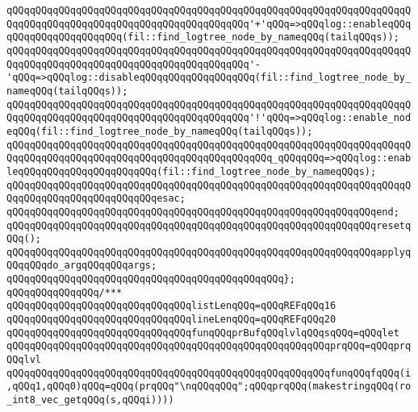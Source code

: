 \verb|qQQqqQQqqQQqqQQqqQQqqQQqqQQqqQQqqQQqqQQqqQQqqQQqqQQqqQQqqQQqqQQqqQQqqQQqqQQqqQQqqQQqqQQqqQQqqQQqqQQqqQQqqQQqqQQq'+'qQQq=>qQQqlog::enableqQQqqQQqqQQqqQQqqQQqqQQq(fil::find_logtree_node_by_nameqQQq(tailqQQqs));|\newline
\verb|qQQqqQQqqQQqqQQqqQQqqQQqqQQqqQQqqQQqqQQqqQQqqQQqqQQqqQQqqQQqqQQqqQQqqQQqqQQqqQQqqQQqqQQqqQQqqQQqqQQqqQQqqQQqqQQq'-'qQQq=>qQQqlog::disableqQQqqQQqqQQqqQQqqQQq(fil::find_logtree_node_by_nameqQQq(tailqQQqs));|\newline
\verb|qQQqqQQqqQQqqQQqqQQqqQQqqQQqqQQqqQQqqQQqqQQqqQQqqQQqqQQqqQQqqQQqqQQqqQQqqQQqqQQqqQQqqQQqqQQqqQQqqQQqqQQqqQQqqQQq'!'qQQq=>qQQqlog::enable_nodeqQQq(fil::find_logtree_node_by_nameqQQq(tailqQQqs));|\newline
\verb|qQQqqQQqqQQqqQQqqQQqqQQqqQQqqQQqqQQqqQQqqQQqqQQqqQQqqQQqqQQqqQQqqQQqqQQqqQQqqQQqqQQqqQQqqQQqqQQqqQQqqQQqqQQqqQQqqQQq_qQQqqQQq=>qQQqlog::enableqQQqqQQqqQQqqQQqqQQqqQQq(fil::find_logtree_node_by_nameqQQqs);|\newline
\verb|qQQqqQQqqQQqqQQqqQQqqQQqqQQqqQQqqQQqqQQqqQQqqQQqqQQqqQQqqQQqqQQqqQQqqQQqqQQqqQQqqQQqqQQqqQQqqQQqesac;|\newline
\verb|qQQqqQQqqQQqqQQqqQQqqQQqqQQqqQQqqQQqqQQqqQQqqQQqqQQqqQQqqQQqqQQqend;|\newline
\newline
\verb|qQQqqQQqqQQqqQQqqQQqqQQqqQQqqQQqqQQqqQQqqQQqqQQqqQQqqQQqqQQqqQQqresetqQQq();|\newline
\newline
\verb|qQQqqQQqqQQqqQQqqQQqqQQqqQQqqQQqqQQqqQQqqQQqqQQqqQQqqQQqqQQqqQQqapplyqQQqqQQqdo_argqQQqqQQqargs;|\newline
\verb|qQQqqQQqqQQqqQQqqQQqqQQqqQQqqQQqqQQqqQQqqQQqqQQq};|\newline
\verb|qQQqqQQqqQQqqQQq/***|\newline
\verb|qQQqqQQqqQQqqQQqqQQqqQQqqQQqqQQqlistLenqQQq=qQQqREFqQQq16|\newline
\verb|qQQqqQQqqQQqqQQqqQQqqQQqqQQqqQQqlineLenqQQq=qQQqREFqQQq20|\newline
\newline
\verb|qQQqqQQqqQQqqQQqqQQqqQQqqQQqqQQqfunqQQqprBufqQQqlvlqQQqsqQQq=qQQqlet|\newline
\verb|qQQqqQQqqQQqqQQqqQQqqQQqqQQqqQQqqQQqqQQqqQQqqQQqqQQqqQQqprqQQq=qQQqprqQQqlvl|\newline
\verb|qQQqqQQqqQQqqQQqqQQqqQQqqQQqqQQqqQQqqQQqqQQqqQQqqQQqqQQqfunqQQqfqQQq(i,qQQq1,qQQq0)qQQq=qQQq(prqQQq"\nqQQqqQQq";qQQqprqQQq(makestringqQQq(ro_int8_vec_getqQQq(s,qQQqi))))|\newline
